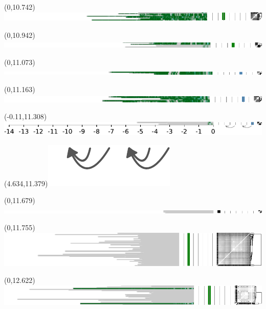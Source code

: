 \documentclass{article}
\begin{document}
\begin{textblock}{13}(0,10.742)\includegraphics{./Figure_S4/chr12-HG003.pdf}\end{textblock}
\begin{textblock}{13}(0,10.942)\includegraphics{./Figure_S4/chr12-HG004.pdf}\end{textblock}
\begin{textblock}{13}(0,11.073)\includegraphics{./Figure_S4/chr12-HG005.pdf}\end{textblock}
\begin{textblock}{13}(0,11.163)\includegraphics{./Figure_S4/chr12-HG006.pdf}\end{textblock}
\begin{textblock}{13}(-0.11,11.308)\includegraphics{./Figure_S4/chr12-HG007.pdf}\end{textblock}
\begin{textblock}{13}(4.634,11.379)\includegraphics[width=.78in,keepaspectratio]{Figure_4/fatter-arrows.pdf}\end{textblock}
\begin{textblock}{13}(0,11.679)\includegraphics{./Figure_S4/17ptel_1_500K_1_12_12-HG001.pdf}\end{textblock}
\begin{textblock}{13}(0,11.755)\includegraphics{./Figure_S4/17ptel_1_500K_1_12_12-HG002.pdf}\end{textblock}
\begin{textblock}{13}(0,12.622)\includegraphics{./Figure_S4/17ptel_1_500K_1_12_12-HG003.pdf}\end{textblock}
\end{document}
